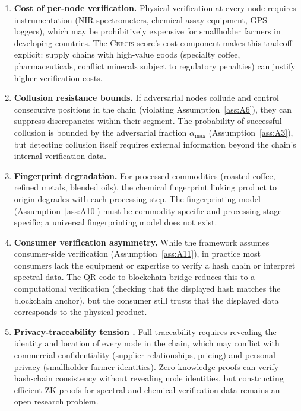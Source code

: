 \documentclass[11pt,a4paper]{article}
\theoremstyle{definition}
\theoremstyle{remark}
\newcommand{\Cercis}{\textsc{Cercis}}
\begin{document}
\begin{enumerate}[label=(\arabic*)]
    \item \textbf{Cost of per-node verification.} Physical verification at every node requires instrumentation (NIR spectrometers, chemical assay equipment, GPS loggers), which may be prohibitively expensive for smallholder farmers in developing countries. The \Cercis{} score's cost component makes this tradeoff explicit: supply chains with high-value goods (specialty coffee, pharmaceuticals, conflict minerals subject to regulatory penalties) can justify higher verification costs.
    
    \item \textbf{Collusion resistance bounds.} If adversarial nodes collude and control consecutive positions in the chain (violating Assumption~\ref{ass:A6}), they can suppress discrepancies within their segment. The probability of successful collusion is bounded by the adversarial fraction $\alpha_{\max}$ (Assumption~\ref{ass:A3}), but detecting collusion itself requires external information beyond the chain's internal verification data.
    
    \item \textbf{Fingerprint degradation.} For processed commodities (roasted coffee, refined metals, blended oils), the chemical fingerprint linking product to origin degrades with each processing step. The fingerprinting model (Assumption~\ref{ass:A10}) must be commodity-specific and processing-stage-specific; a universal fingerprinting model does not exist.
    
    \item \textbf{Consumer verification asymmetry.} While the framework assumes consumer-side verification (Assumption~\ref{ass:A11}), in practice most consumers lack the equipment or expertise to verify a hash chain or interpret spectral data. The QR-code-to-blockchain bridge reduces this to a computational verification (checking that the displayed hash matches the blockchain anchor), but the consumer still trusts that the displayed data corresponds to the physical product.
    
    \item \textbf{Privacy-traceability tension .} Full traceability requires revealing the identity and location of every node in the chain, which may conflict with commercial confidentiality (supplier relationships, pricing) and personal privacy (smallholder farmer identities). Zero-knowledge proofs can verify hash-chain consistency without revealing node identities, but constructing efficient ZK-proofs for spectral and chemical verification data remains an open research problem.
\end{enumerate}
\end{document}
